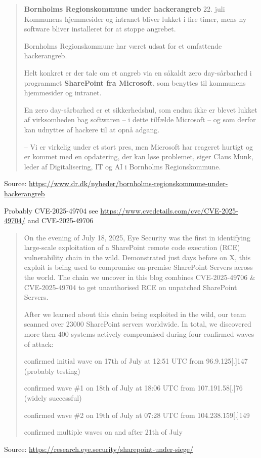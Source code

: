 \documentclass[Screen16to9,17pt]{foils}
\begin{document}
\begin{quote}
{\bf\large Bornholms Regionskommune under hackerangreb} 22. juli\\
Kommunens hjemmesider og intranet bliver lukket i fire timer, mens ny software bliver installeret for at stoppe angrebet.

Bornholms Regionskommune har været udsat for et omfattende hackerangreb.

Helt konkret er der tale om et angreb via en såkaldt zero day-sårbarhed i programmet {\bf SharePoint fra Microsoft}, som benyttes til kommunens hjemmesider og intranet.

En zero day-sårbarhed er et sikkerhedshul, som endnu ikke er blevet lukket af virksomheden bag softwaren – i dette tilfælde Microsoft – og som derfor kan udnyttes af hackere til at opnå adgang.

– Vi er virkelig under et stort pres, men Microsoft har reageret hurtigt og er kommet med en opdatering, der kan løse problemet, siger Claus Munk, leder af Digitalisering, IT og AI i Bornholms Regionskommune.
\end{quote}
Source: \url{https://www.dr.dk/nyheder/bornholms-regionskommune-under-hackerangreb}
\begin{list2}
\item Probably CVE-2025-49704 see \url{https://www.cvedetails.com/cve/CVE-2025-49704/} and CVE-2025-49706
\end{list2}




\begin{quote}
On the evening of July 18, 2025, Eye Security was the first in identifying large-scale exploitation of a SharePoint remote code execution (RCE) vulnerability chain in the wild. Demonstrated just days before on X, this exploit is being used to compromise on-premise SharePoint Servers across the world. The chain we uncover in this blog combines CVE-2025-49706 \& CVE-2025-49704 to get unauthorised RCE on unpatched SharePoint Servers.

After we learned about this chain being exploited in the wild, our team scanned over 23000 SharePoint servers worldwide. In total, we discovered more then 400 systems actively compromised during four confirmed waves of attack:

\begin{list2}
\item     confirmed initial wave on 17th of July at 12:51 UTC from 96.9.125[.]147 (probably testing)
\item     confirmed wave \#1 on 18th of July at 18:06 UTC from 107.191.58[.]76 (widely successful)
\item     confirmed wave \#2 on 19th of July at 07:28 UTC from 104.238.159[.]149
\item     confirmed multiple waves on and after 21th of July
\end{list2}

\end{quote}
Source: \url{https://research.eye.security/sharepoint-under-siege/}
\end{document}
